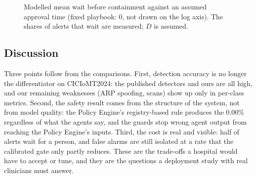 \documentclass[preprint,12pt]{elsarticle}
\newcommand{\pacr}{\textsc{Pacr}}
\begin{document}
\begin{figure}[htbp]
\centering
{}
\caption{Modelled mean wait before containment against an assumed approval time (fixed playbook: 0, not drawn on the log axis). The shares of alerts that wait are measured; $D$ is assumed.}
\label{fig:wait}
\end{figure}

\subsection{Discussion}
\label{sec:compare-disc}
Three points follow from the comparisons. First, detection accuracy is no longer the differentiator on CICIoMT2024: the published detectors and ours are all high, and our remaining weaknesses (ARP spoofing, scans) show up only in per-class metrics. Second, the safety result comes from the structure of the system, not from model quality: the Policy Engine's registry-based rule produces the 0.00\% regardless of what the agents say, and the guards stop wrong agent output from reaching the Policy Engine's inputs. Third, the cost is real and visible: half of alerts wait for a person, and false alarms are still isolated at a rate that the calibrated gate only partly reduces. These are the trade-offs a hospital would have to accept or tune, and they are the questions a deployment study with real clinicians must answer.

\end{document}
